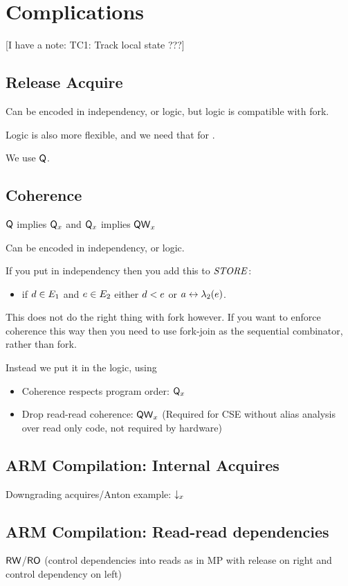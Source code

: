 \section{Complications}

[I have a note: TC1: Track local state ???]

\subsection{Release Acquire}

Can be encoded in independency, or logic, but logic is compatible with fork.

Logic is also more flexible, and we need that for \armeight.

We use $\Q$.

\subsection{Coherence}

$\Q$ implies $\Qx{\aLoc}$
and
$\Qx{\aLoc}$ implies $\Qw{\aLoc}$

Can be encoded in independency, or logic.

If you put in independency then you add this to $\sSTORE{}{}$:
\begin{itemize}
\item if $\bEv\in\aEvs_1$ and $\aEv\in\aEvs_2$ either $\bEv<\SB0\aEv$ or $a\reorder\labeling_2(\aEv)$.
\end{itemize}
This does not do the right thing with fork however.  If you want to enforce
coherence this way then you need to use fork-join as the sequential
combinator, rather than fork.

Instead we put it in the logic, using 

\begin{itemize}
\item Coherence respects program order: $\Qx{\aLoc}$
\item Drop read-read coherence: $\Qw{\aLoc}$ (Required for CSE without
  alias analysis over read only code, not required by hardware)
\end{itemize}



\subsection{ARM Compilation: Internal Acquires}
Downgrading acquires/Anton example: $\Dx{\aLoc}$

\subsection{ARM Compilation: Read-read dependencies}
$\RW$/$\RO$ (control dependencies into reads as in MP with
release on right and control dependency on left)

